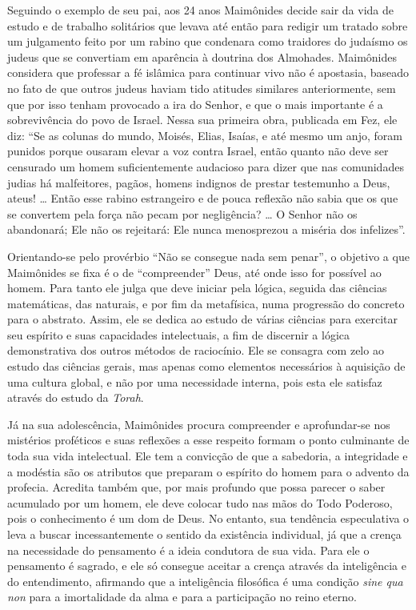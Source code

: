 Seguindo o exemplo de seu pai, aos 24 anos Maimônides decide sair da
vida de estudo e de trabalho solitários que levava até então para
redigir um tratado sobre um julgamento feito por um rabino que condenara
como traidores do judaísmo os judeus que se convertiam em aparência à
doutrina dos Almohades. Maimônides considera que professar a fé
islâmica para continuar vivo não é apostasia, baseado no fato de que outros judeus haviam tido
atitudes similares anteriormente, sem que por isso tenham provocado a
ira do Senhor, e que o mais importante é a sobrevivência do povo de
Israel. Nessa sua primeira obra, publicada em Fez, ele diz: ``Se as
colunas do mundo, Moisés, Elias, Isaías, e até mesmo um anjo, foram
punidos porque ousaram elevar a voz contra Israel, então quanto não
deve ser censurado um homem suficientemente audacioso para dizer que
nas comunidades judias há malfeitores, pagãos, homens indignos de
prestar testemunho a Deus, ateus! \ldots{} Então esse rabino estrangeiro e de
pouca reflexão não sabia que os que se convertem pela força não pecam
por negligência? \ldots{} O Senhor não os abandonará; Ele não os rejeitará:
Ele nunca menosprezou a miséria dos infelizes''.

Orientando-se pelo provérbio ``Não se consegue nada sem penar'', o
objetivo a que Maimônides se fixa é o de ``compreender'' Deus, até onde
isso for possível ao homem. Para tanto ele julga que deve iniciar pela
lógica, seguida das ciências matemáticas, das naturais, e por fim da
metafísica, numa progressão do concreto para o abstrato. Assim, ele se
dedica ao estudo de várias ciências para exercitar seu espírito e suas
capacidades intelectuais, a fim de discernir a lógica demonstrativa dos
outros métodos de raciocínio. Ele se consagra com zelo ao estudo das
ciências gerais, mas apenas como elementos necessários à aquisição de
uma cultura global, e não por uma necessidade interna, pois esta ele
satisfaz através do estudo da \emph{Torah}.

Já na sua adolescência, Maimônides procura compreender e aprofundar-se
nos mistérios proféticos e suas reflexões a esse respeito formam o ponto
culminante de toda sua vida intelectual. Ele tem a convicção de que a
sabedoria, a integridade e a modéstia são os atributos que preparam o
espírito do homem para o advento da profecia. Acredita também que, por
mais profundo que possa parecer o saber acumulado por um homem, ele deve
colocar tudo nas mãos do Todo Poderoso, pois o conhecimento é um dom de
Deus. No entanto, sua tendência especulativa o leva a buscar
incessantemente o sentido da existência individual, já que a crença na
necessidade do pensamento é a ideia condutora de sua vida. Para ele o
pensamento é sagrado, e ele só consegue aceitar a crença através da
inteligência e do entendimento, afirmando que a inteligência filosófica
é uma condição \emph{sine qua non} para a imortalidade da alma e para a
participação no reino eterno.

